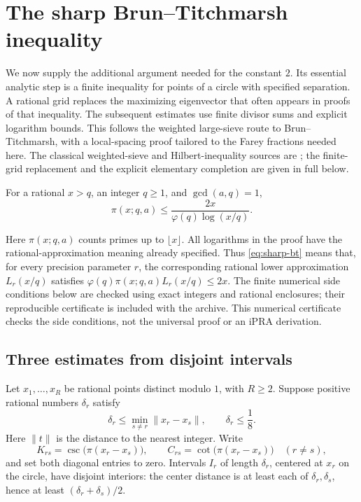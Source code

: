 \section{The sharp Brun--Titchmarsh inequality}
\label{sec:sharp-bt}

We now supply the additional argument needed for the constant $2$.
Its essential analytic step is a finite inequality for points of a
circle with specified separation.  A rational grid replaces the
maximizing eigenvector that often appears in proofs of that inequality.
The subsequent estimates use finite divisor sums and explicit
logarithm bounds.  This follows the weighted large-sieve route to
Brun--Titchmarsh, with a local-spacing proof tailored to the Farey
fractions needed here. The classical weighted-sieve and Hilbert-inequality sources are \cite{MontgomeryVaughan1973,MontgomeryVaughan1974}; the finite-grid replacement and the explicit elementary completion are given in full below.

\begin{theorem}
\label{thm:sharp-bt}
For a rational $x>q$, an integer $q\geq1$, and $\gcd(a,q)=1$,
\begin{equation}
 \boxed{\displaystyle
 \pi(x;q,a)\leq\frac{2x}{\varphi(q)\log(x/q)}.}
 \label{eq:sharp-bt}
\end{equation}
\end{theorem}

Here $\pi(x;q,a)$ counts primes up to $\lfloor x\rfloor$.
All logarithms in the proof have the rational-approximation meaning
already specified.  Thus \eqref{eq:sharp-bt} means that, for every
precision parameter $r$, the corresponding rational lower
approximation $L_r(x/q)$ satisfies
$\varphi(q)\pi(x;q,a)L_r(x/q)\leq2x$.
The finite numerical side conditions below are checked using exact
integers and rational enclosures; their reproducible certificate is
included with the archive.  This numerical certificate checks the
side conditions, not the universal proof or an iPRA derivation.

\subsection{Three estimates from disjoint intervals}

Let $x_1,\ldots,x_R$ be rational points distinct modulo $1$, with
$R\geq2$.  Suppose positive rational numbers $\delta_r$ satisfy
\begin{equation}
 \delta_r\leq\min_{s\ne r}\|x_r-x_s\|,
 \qquad \delta_r\leq\frac18.
 \label{eq:local-spacing}
\end{equation}
Here $\|t\|$ is the distance to the nearest integer.  Write
\[
 K_{rs}=\csc\bigl(\pi(x_r-x_s)\bigr),\qquad
 C_{rs}=\cot\bigl(\pi(x_r-x_s)\bigr)
 \quad(r\ne s),
\]
and set both diagonal entries to zero.  Intervals $I_r$ of length
$\delta_r$, centered at $x_r$ on the circle, have disjoint interiors:
the center distance is at least each of $\delta_r,\delta_s$, hence at
least $(\delta_r+\delta_s)/2$.

